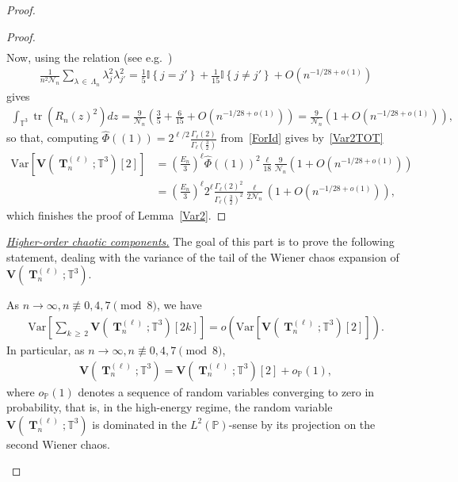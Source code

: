 \documentclass[10pt]{amsart}
\theoremstyle{definition}\newtheorem{defi}[theo]{Definition}\newtheorem{rema}[theo]{Remark}\newtheorem{exam}[theo]{Example}\newtheorem{exem}[theo]{Example}\newtheorem{nota}[theo]{Notation}
\DeclareMathOperator{\bT}{\mathbf{T}}
\DeclareMathOperator{\Tr}{tr}
\newcommand{\bfv}{\mathbf{V}}
\newcommand{\T}{\mathbb{T}^3}
\newcommand{\Prob}{\mathbb{P}}
\newcommand{\V}[1]{\mathrm{Var}{\left[#1\right]}}
\newcommand{\ind}[1]{\mathbb{I}
\left\{#1\right\}}
\newcommand{\notcon}[3]{ {#1} \not\equiv {#2} \pmod {#3} }
\newcommand{\Nn}{\mathcal{N}_n}
\begin{document}
\begin{proof}
\begin{proof}
\begin{align*}
\end{align*}
Now, using the relation (see e.g.~\cite[Appendix~C]{Cam17})
\begin{gather*}
\frac{1}{n^2\Nn}\sum_{\lambda\,\in\,\Lambda_n} \lambda_j^2 \lambda_{j'}^2 = \frac{1}{5}\ind{j=j'} + \frac{1}{15}\ind{j\neq j'} + O\left(n^{-1/28+o(1)}\right)
\end{gather*}
gives
\begin{gather*}
\int_{\T} \Tr\left(R_n(z)^2\right) dz =
\frac{9}{\Nn} \left(\frac{3}{5}+\frac{6}{15} + O\left(n^{-1/28+o(1)}\right)\right)=
\frac{9}{\Nn}\left(1+ O\left(n^{-1/28+o(1)}\right)\right),
\end{gather*}
so that, computing $\widehat{\Phi}((1))=2^{\ell/2}\frac{\Gamma_{\ell}(2)}{\Gamma_{\ell}(\frac{3}{2})}$ from~\eqref{ForId} gives by~\eqref{Var2TOT}
\begin{align*}
\V{\bfv\left(\bT_n^{(\ell)};\T\right)[2]} &= \left(\frac{E_n}{3}\right)^{\ell} \widehat{\Phi}((1))^2
\frac{\ell}{18}\frac{9}{\Nn}\left(1+ O\left(n^{-1/28+o(1)}\right)\right) \\
&=\left(\frac{E_n}{3}\right)^{\ell} 2^{\ell} \frac{\Gamma_{\ell}(2)^2}{\Gamma_{\ell}(\frac{3}{2})^2}
\frac{\ell}{2\Nn}\left(1 + O\left(n^{-1/28+o(1)}\right)\right),
\end{align*}
which finishes the proof of Lemma~\ref{Var2}.
\end{proof}



\noindent\underline{\emph{Higher-order chaotic components.}} The goal of this part is to prove the following statement, dealing with the variance of the tail of the Wiener chaos expansion of $\bfv(\bT_n^{(\ell)};\T)$.

\begin{prop}\label{Higher}
As $n\to \infty,\notcon{n}{0,4,7}{8}$, we have
\begin{gather}\label{Tail}
\V{\sum_{k\,\geq\,2} \bfv \left(\bT_n^{(\ell)}; \T\right)[2k]} = o\left(\V{\bfv\left(\bT_n^{(\ell)};\T\right)[2]}\right).
\end{gather}
In particular, as $ n \to \infty, \notcon{n}{0,4,7}{8}$,
\begin{gather}\label{dom2}
\bfv\left(\bT_n^{(\ell)};\T\right) =
\bfv\left(\bT_n^{(\ell)};\T\right)[2]+o_{\Prob}(1),
\end{gather}
where $o_{\Prob}(1)$ denotes a sequence of random variables converging to zero in probability, that is, in the high-energy regime, the random variable $\bfv(\bT_n^{(\ell)};\T)$ is dominated in the $L^2(\Prob)$-sense by its projection on the second Wiener chaos.
\end{prop}


\end{proof}
\end{document}

